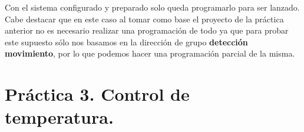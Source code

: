 \documentclass[10pt]{article}
\begin{document}
Con el sistema configurado y preparado solo queda programarlo para ser lanzado. Cabe destacar que en este caso al tomar como base el proyecto de la práctica anterior no es necesario realizar una programación de todo ya que para probar este supuesto sólo nos basamos en la dirección de grupo \textbf{detección movimiento}, por lo que podemos hacer una programación parcial de la misma.\\

\section{Práctica 3. Control de temperatura.} 
\end{document}
